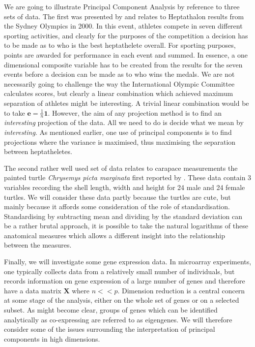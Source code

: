 We are going to illustrate Principal Component Analysis by reference to three sets of data.   The first was presented by \cite{Karlis+etal:2003} and relates to Heptathalon results from the Sydney Olympics in 2000.   In this event, athletes compete in seven different sporting activities, and clearly for the purposes of the competition a decision has to be made as to who is the best heptathelete overall.  For sporting purposes, points are awarded for performance in each event and summed.   In essence, a one dimensional composite variable has to be created from the results for the seven events before a decision can be made as to who wins the medals.   We are not necessarily going to challenge the way the International Olympic Committee calculates scores, but clearly a linear combination which achieved maximum separation of athletes might be interesting.   A trivial linear combination would be to take $\boldsymbol{e} = \frac{1}{n}\boldsymbol{1}$.   However, the aim of any projection method is to find an \emph{interesting} projection of the data.   All we need to do is decide what we mean by \emph{interesting}.   As mentioned earlier, one use of principal components is to find projections where the variance is maximised, thus maximising the separation between heptatheletes.  

The second rather well used set of data relates to carapace measurements the painted turtle \textit{Chrysemys picta marginata} first reported by \cite{Jolicoeur+Mosimann:1960}.   These data contain 3 variables recording the shell length, width and height for 24 male and 24 female turtles.   We will consider these data partly because the turtles are cute, but mainly because it affords some consideration of the role of standardisation.   Standardising by subtracting mean and dividing by the standard deviation can be a rather brutal approach, it is possible to take the natural logarithms of these anatomical measures which allows a different insight into the relationship between the measures.

Finally, we will investigate some gene expression data.   In microarray experiments, one typically collects data from a relatively small number of individuals, but records information on gene expression of a large number of genes and therefore have a data matrix $\boldsymbol{X}$ where $n << p$.   Dimension reduction is a central concern at some stage of the analysis, either on the whole set of genes or on a selected subset.   As might become clear, groups of genes which can be identified analytically as co-expressing are referred to as eigengenes.   We will therefore consider some of the issues surrounding the interpretation of principal components in high dimensions.

